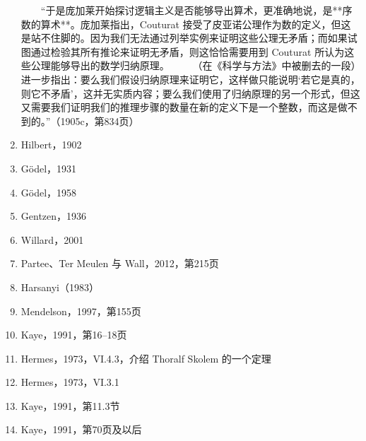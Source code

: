 \begin{enumerate}
    “于是庞加莱开始探讨逻辑主义是否能够导出算术，更准确地说，是**序数的算术**。庞加莱指出，Couturat 接受了皮亚诺公理作为数的定义，但这是站不住脚的。因为我们无法通过列举实例来证明这些公理无矛盾；而如果试图通过检验其所有推论来证明无矛盾，则这恰恰需要用到 Couturat 所认为这些公理能够导出的数学归纳原理。
    （在《科学与方法》中被删去的一段）进一步指出：要么我们假设归纳原理来证明它，这样做只能说明‘若它是真的，则它不矛盾’，这并无实质内容；要么我们使用了归纳原理的另一个形式，但这又需要我们证明我们的推理步骤的数量在新的定义下是一个整数，而这是做不到的。”（1905c，第834页）
\item Hilbert，1902
\item Gödel，1931
\item Gödel，1958
\item Gentzen，1936
\item Willard，2001
\item Partee、Ter Meulen 与 Wall，2012，第215页
\item Harsanyi（1983）
\item Mendelson，1997，第155页
\item Kaye，1991，第16–18页
\item Hermes，1973，VI.4.3，介绍 Thoralf Skolem 的一个定理
\item Hermes，1973，VI.3.1
\item Kaye，1991，第11.3节
\item Kaye，1991，第70页及以后
\end{enumerate}
